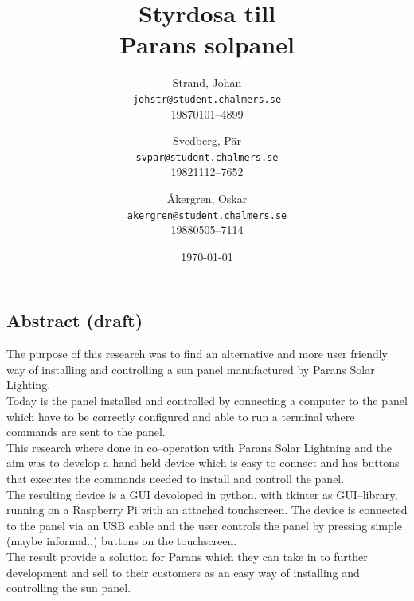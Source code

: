 \documentclass{article}
\author{    Strand, Johan \\ \texttt{johstr@student.chalmers.se} \\ 
            19870101--4899 \and
            Svedberg, Pär\\ \texttt{svpar@student.chalmers.se}  \\ 
            19821112--7652 \and
            Åkergren, Oskar\\ \texttt{akergren@student.chalmers.se}  \\ 19880505--7114
}
\title{\vspace{2cm} Styrdosa till \\ Parans solpanel  \vspace{1cm}}
\date{\vspace{8cm}\today}
\begin{document}
    \maketitle
    \thispagestyle{empty}

    \newpage 
    \subsection*{Abstract (draft)} %
    \label{sub:abstract}
            The purpose of this research was to find an alternative and more user friendly way of installing and controlling a sun panel manufactured by Parans Solar Lighting. \\

            \noindent Today is the panel installed and controlled by connecting a computer to the panel which have to be correctly configured and able to run a terminal where commands are sent to the panel.\\

            \noindent This research where done in co--operation with Parans Solar Lightning and the aim was to develop a hand held device which is easy to connect and has buttons that executes the commands needed to install and controll the panel.\\

            \noindent The resulting device is a GUI devoloped in python, with tkinter as GUI--library, running on a Raspberry Pi with an attached touchscreen. The device is connected to the panel via an USB cable and the user controls the panel by pressing simple (maybe informal..) buttons on the touchscreen.\\

            \noindent The result provide a solution for Parans which they can take in to further development and sell to their customers as an easy way of installing and controlling the sun panel.

    \newpage 
\end{document}
